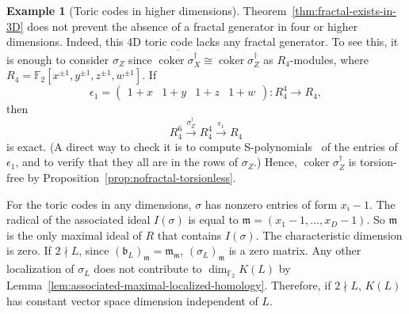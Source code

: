 \documentclass[letterpaper,12pt]{amsart}
\theoremstyle{definition} \newtheorem{defn}{Definition}
\theoremstyle{definition} \newtheorem{rem}{Remark}
\theoremstyle{definition} \newtheorem{example}{Example}
\newcommand{\coker}{\mathop{\mathrm{coker}}}
\newcommand{\FF}{\mathbb{F}}
\newcommand{\mm}{\mathfrak{m}}
\newcommand{\bb}{\mathfrak{b}}
\begin{document}
\begin{example}[Toric codes in higher dimensions]
Theorem~\ref{thm:fractal-exists-in-3D} does not prevent
the absence of a fractal generator in four or higher dimensions.
Indeed, this 4D toric code lacks any fractal generator.
To see this, it is enough to consider $\sigma_Z$
since $\overline{\coker \sigma_X^\dagger} \cong \coker \sigma_Z^\dagger$ as $R_4$-modules,
where $R_4 = \FF_2[x^{\pm 1},y^{\pm 1},z^{\pm 1},w^{\pm 1}]$.
If
\[
\epsilon_1 =
 \begin{pmatrix}
1+x & 1+y & 1+z & 1+w
 \end{pmatrix} : R_4^4 \to R_4,
\]
then
\[
 R_4^6 \xrightarrow{\sigma_Z^\dagger} R_4^4 \xrightarrow{\epsilon_1} R_4
\]
is exact.
(A direct way to check it is to compute S-polynomials~\cite[Chapter~15]{Eisenbud}
of the entries of $\epsilon_1$,
and to verify that they all are in the rows of $\sigma_Z$.)
Hence, $\coker \sigma_Z^\dagger$ is torsion-free by Proposition~\ref{prop:nofractal-torsionless}.


For the toric codes in any dimensions, $\sigma$ has nonzero entries of form $x_i-1$.
The radical of the associated ideal $I(\sigma)$ is equal to $\mm = (x_1-1,\ldots, x_D-1)$.
So $\mm$ is the only maximal ideal of $R$ that contains $I(\sigma)$.
The characteristic dimension is zero.
If $2 \nmid L$, since $(\bb_L)_{\mm} = \mm_{\mm}$,
$(\sigma_L)_\mm$ is a zero matrix.
Any other localization of $\sigma_L$ does not contribute to $\dim_{\FF_2} K(L)$
by Lemma~\ref{lem:associated-maximal-localized-homology}.
Therefore, if $2 \nmid L$, $K(L)$ has constant vector space dimension independent of $L$.


\end{example}
\end{document}
